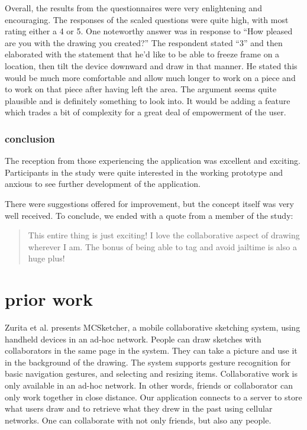 \documentclass{chi2009}
\begin{document}
Overall, the results from the questionnaires were very enlightening and
encouraging.   The responses of the scaled questions were quite high, with most
rating either a 4 or 5.  One noteworthy answer was in response to ``How pleased
are you with the drawing you created?'' The respondent stated ``3'' and then
elaborated with the statement that he'd like to be able to freeze frame on a
location, then tilt the device downward and draw in that manner.  He stated
this would be much more comfortable and allow much longer to work on a piece
and to work on that piece after having left the area.  The argument seems quite
plausible and is definitely something to look into.  It would be adding a
feature which trades a bit of complexity for a great deal of empowerment of the
user.

\subsubsection{conclusion}

The reception from those experiencing the application was excellent and
exciting.   Participants in the study were quite interested in the working
prototype and anxious to see further development of the application.

There were suggestions offered for improvement, but the concept itself was very
well received.  To conclude, we ended with a quote from a member of the study:

\begin{quote}
This entire thing is just exciting!  I love the collaborative aspect of drawing
wherever I am. The bonus of being able to tag and avoid jailtime is also a
huge plus!
\end{quote}

\section{prior work}

Zurita et al. \cite{sketching:zurita} presents MCSketcher, a mobile
collaborative sketching system, using handheld devices in an ad-hoc network.
People can draw sketches with collaborators in the same page in the system.
They can take a picture and use it in the background of the drawing. The system
supports gesture recognition for basic navigation gestures, and selecting and
resizing items. Collaborative work is only available in an ad-hoc network. In
other words, friends or collaborator can only work together in close distance.
Our application connects to a server to store what users draw and to retrieve
what they drew in the past using cellular networks. One can collaborate with
not only friends, but also any people.
\end{document}
